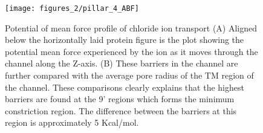 \documentclass[9pt,twocolumn,twoside,lineno]{pnas-new}
\begin{document}


\begin{figure}
\centering
\texttt{[image: figures\_2/pillar\_4\_ABF]}
\caption{ Potential of mean force profile of chloride ion transport  (A) Aligned below the horizontally laid protein figure is the plot showing the potential mean force experienced by the ion as it moves through the channel along the Z-axis. (B) These barriers in the channel are further compared with the average pore radius of the TM region of the channel. These comparisons clearly explains that the highest barriers are found at the 9' regions which forms the minimum constriction region. The difference between the barriers at this region is approximately 5 Kcal/mol.}
\label{fig:abf}
\end{figure}

\end{document}
